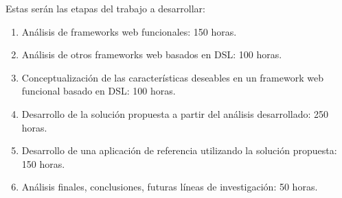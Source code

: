 \documentclass[12pt]{article}
\begin{document}
Estas serán las etapas del trabajo a desarrollar:

\begin{enumerate}
	\item Análisis de frameworks web funcionales: 150 horas.
	\item Análisis de otros frameworks web basados en DSL: 100 horas.
	\item Conceptualización de las características deseables en un framework web funcional basado en DSL: 100 horas.
	\item Desarrollo de la solución propuesta a partir del análisis desarrollado: 250 horas.
	\item Desarrollo de una aplicación de referencia utilizando la solución propuesta: 150 horas.
	\item Análisis finales, conclusiones, futuras líneas de investigación: 50 horas.
\end{enumerate}

\printglossaries



\end{document}
